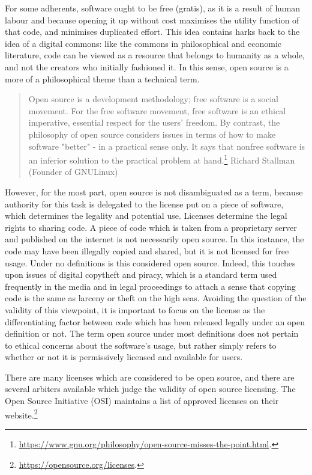 For some adherents, software ought to be free (gratis), as it is a result of human labour and because opening it up without cost maximises the utility function of that code, and minimises duplicated effort. This idea contains harks back to the idea of a digital commons: like the commons in philosophical and economic literature, code can be viewed as a resource that belongs to humanity as a whole, and not the creators who initially fashioned it. In this sense, open source is a more of a philosophical theme than a technical term.

\begin{quote}
Open source is a development methodology; free software is a social movement. For the free software movement, free software is an ethical imperative, essential respect for the users' freedom. By contrast, the philosophy of open source considers issues in terms of how to make software  "better" - in a practical sense only. It says that nonfree software is an inferior solution to the practical problem at hand.\footnote{\href{https://www.gnu.org/philosophy/open-source-misses-the-point.html}{https://www.gnu.org/philosophy/open-source-misses-the-point.html}. }
\signed Richard Stallman (Founder of GNU\/Linux)
\end{quote}

However, for the most part, open source is not disambiguated as a term, because authority for this task is delegated to the license put on a piece of software, which determines the legality and potential use. Licenses determine the legal rights to sharing code. A piece of code which is taken from a proprietary server and published on the internet is not necessarily open source. In this instance, the code may have been illegally copied and shared, but it is not licensed for free usage. Under no definitions is this considered open source. Indeed, this touches upon issues of digital copytheft and piracy, which is a standard term used frequently in the media and in legal proceedings to attach a sense that copying code is the same as larceny or theft on the high seas. Avoiding the question of the validity of this viewpoint, it is important to focus on the license as the differentiating factor between code which has been released legally under an open definition or not. The term open source under most definitions does not pertain to ethical concerns about the software's usage, but rather simply refers to whether or not it is permissively licensed and available for users.

There are many licenses which are considered to be open source, and there are several arbiters available which judge the validity of open source licensing. The Open Source Initiative (OSI) maintains a list of approved licenses on their website.\footnote{\href{https://opensource.org/licenses}{https://opensource.org/licenses}. }

